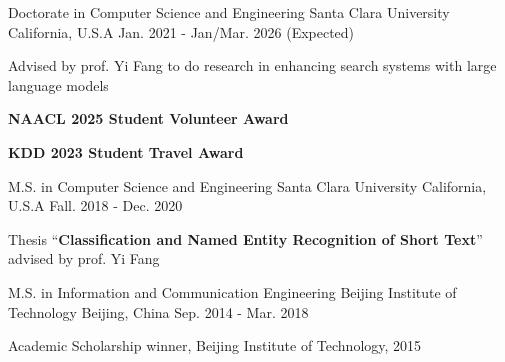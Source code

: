 

\begin{cventries}


  \cventry
    {Doctorate in Computer Science and Engineering} %
    {Santa Clara University} %
    {California, U.S.A} %
    {Jan. 2021 - Jan/Mar. 2026 (Expected)} %
    {
      \begin{cvitems} %
        \item {Advised by prof. Yi Fang to do research in enhancing search systems with large language models}
        \item {\textbf{NAACL 2025 Student Volunteer Award}}
        \item {\textbf{KDD 2023 Student Travel Award}}
      \end{cvitems}
    }
    
 \cventry
    {M.S. in Computer Science and Engineering} %
    {Santa Clara University} %
    {California, U.S.A} %
    {Fall. 2018 - Dec. 2020} %
    {
      \begin{cvitems} %
        \item {Thesis ``\textbf{Classification and Named Entity Recognition of Short Text}'' advised by prof. Yi Fang}
      \end{cvitems}
    }
    
 \cventry
    {M.S. in Information and Communication Engineering} %
    {Beijing Institute of Technology} %
    {Beijing, China} %
    {Sep. 2014 - Mar. 2018} %
    {
      \begin{cvitems} %
        \item {Academic Scholarship winner, Beijing Institute of Technology, 2015}
      \end{cvitems}
    }
    

\end{cventries}

